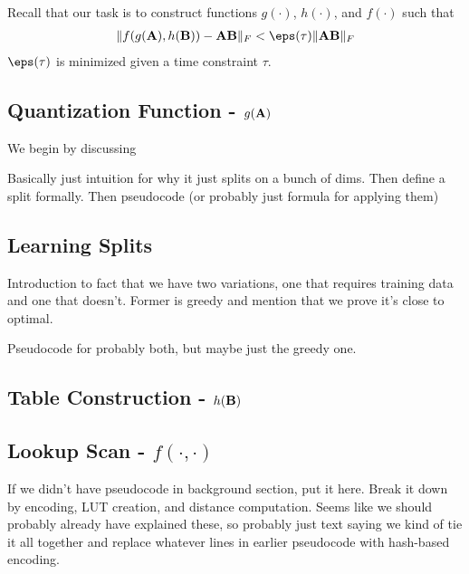 
Recall that our task is to construct functions $g(\cdot)$, $h(\cdot)$, and $f(\cdot)$ such that
\begin{align}
    \norm{f(g(\A), h(\B)) - \A\B}_F < \eps(\tau) \norm{\A\B}_F
\end{align}
$\eps(\tau)$ is minimized given a time constraint $\tau$.

\subsection{Quantization Function - $g(\mathbf{A})$}

We begin by discussing

Basically just intuition for why it just splits on a bunch of dims. Then define a split formally. Then pseudocode (or probably just formula for applying them)

\subsection{Learning Splits}

Introduction to fact that we have two variations, one that requires training data and one that doesn't. Former is greedy and mention that we prove it's close to optimal.

Pseudocode for probably both, but maybe just the greedy one.

\subsection{Table Construction - $h(\mathbf{B})$}

\subsection{Lookup Scan - $f(\cdot,\cdot)$}

If we didn't have pseudocode in background section, put it here. Break it down by encoding, LUT creation, and distance computation. Seems like we should probably already have explained these, so probably just text saying we kind of tie it all together and replace whatever lines in earlier pseudocode with hash-based encoding.


